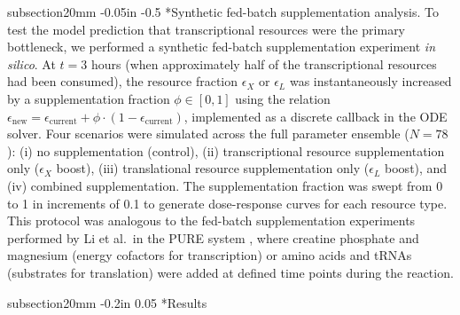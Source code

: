 \documentclass[12pt]{article}
\makeatletter
\renewcommand\subsection{\@startsection
	{subsection}{2}{0mm}
	{-0.05in}
	{-0.5\baselineskip}
	{\normalfont\normalsize\bfseries}}
\renewcommand\section{\@startsection
	{subsection}{2}{0mm}
	{-0.2in}
	{0.05\baselineskip}
	{\normalfont\large\bfseries}}
\makeatother
\begin{document}
\subsection*{Synthetic fed-batch supplementation analysis.}
To test the model prediction that transcriptional resources were the primary bottleneck, we performed a synthetic fed-batch supplementation experiment \textit{in silico}. At $t = 3$ hours (when approximately half of the transcriptional resources had been consumed), the resource fraction $\epsilon_X$ or $\epsilon_L$ was instantaneously increased by a supplementation fraction $\phi \in [0, 1]$ using the relation $\epsilon_{\text{new}} = \epsilon_{\text{current}} + \phi \cdot (1 - \epsilon_{\text{current}})$, implemented as a discrete callback in the ODE solver. Four scenarios were simulated across the full parameter ensemble ($N = 78$): (i) no supplementation (control), (ii) transcriptional resource supplementation only ($\epsilon_X$ boost), (iii) translational resource supplementation only ($\epsilon_L$ boost), and (iv) combined supplementation. The supplementation fraction was swept from 0 to 1 in increments of 0.1 to generate dose-response curves for each resource type. This protocol was analogous to the fed-batch supplementation experiments performed by Li et al.\ in the PURE system \cite{li2017dissecting}, where creatine phosphate and magnesium (energy cofactors for transcription) or amino acids and tRNAs (substrates for translation) were added at defined time points during the reaction.

\clearpage

\section*{Results}
\end{document}
